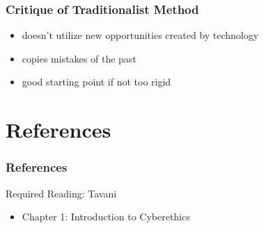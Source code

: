 \documentclass[dvipsnames]{beamer}
\theoremstyle{plain}
\begin{document}
\begin{frame}
  \frametitle{Critique of Traditionalist Method}

  \begin{itemize}
    \item doesn't utilize new opportunities created by technology
    \item copies mistakes of the past

    \bigskip
    \item good starting point if not too rigid
  \end{itemize}
\end{frame}

\section*{References}

\begin{frame}
  \frametitle{References}

  \begin{block}{Required Reading: Tavani}
    \begin{itemize}
      \item Chapter 1: \alert{Introduction to Cyberethics}
    \end{itemize}
  \end{block}
\end{frame}
\end{document}

